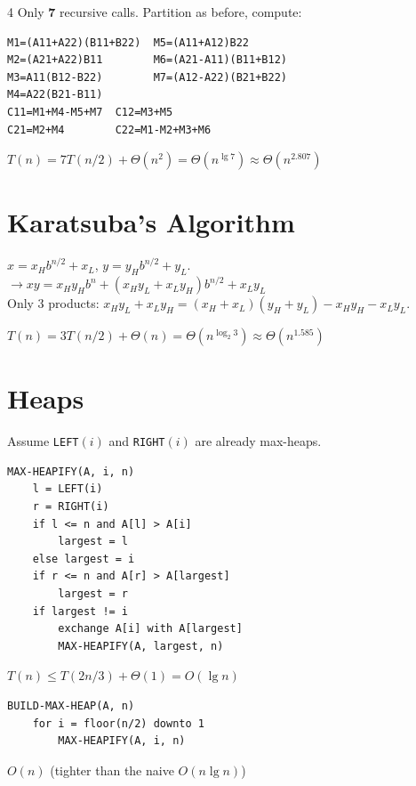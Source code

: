 \documentclass[8pt,a4paper,landscape]{extarticle}
\begin{document}
\begin{multicols*}{4}
Only \textbf{7} recursive calls. Partition as before, compute:
\begin{lstlisting}
M1=(A11+A22)(B11+B22)  M5=(A11+A12)B22
M2=(A21+A22)B11        M6=(A21-A11)(B11+B12)
M3=A11(B12-B22)        M7=(A12-A22)(B21+B22)
M4=A22(B21-B11)
C11=M1+M4-M5+M7  C12=M3+M5
C21=M2+M4        C22=M1-M2+M3+M6
\end{lstlisting}
\begin{prop}[title=Runtime]
$T(n)=7T(n/2)+\Theta(n^2)=\Theta(n^{\lg 7})\approx\Theta(n^{2.807})$
\end{prop}

\section{Karatsuba's Algorithm}
$x=x_H b^{n/2}+x_L$, $y=y_H b^{n/2}+y_L$.\\
$\rightarrow xy=x_Hy_H b^n+(x_Hy_L+x_Ly_H)b^{n/2}+x_Ly_L$\\
Only 3 products: $x_Hy_L+x_Ly_H=(x_H{+}x_L)(y_H{+}y_L)-x_Hy_H-x_Ly_L$.

\begin{prop}[title=Runtime]
$T(n)=3T(n/2)+\Theta(n)=\Theta(n^{\log_2 3})\approx\Theta(n^{1.585})$
\end{prop}

\section{Heaps}
Assume \texttt{LEFT}$(i)$ and \texttt{RIGHT}$(i)$ are already max-heaps.

\begin{lstlisting}
MAX-HEAPIFY(A, i, n)
    l = LEFT(i)
    r = RIGHT(i)
    if l <= n and A[l] > A[i]
        largest = l
    else largest = i
    if r <= n and A[r] > A[largest]
        largest = r
    if largest != i
        exchange A[i] with A[largest]
        MAX-HEAPIFY(A, largest, n)
\end{lstlisting}

\begin{prop}[title=Runtime]
$T(n) \le T(2n/3) + \Theta(1) = O(\lg n)$
\end{prop}

\begin{lstlisting}
BUILD-MAX-HEAP(A, n)
    for i = floor(n/2) downto 1
        MAX-HEAPIFY(A, i, n)
\end{lstlisting}

\begin{prop}[title=Runtime]
$O(n)$ (tighter than the naive $O(n \lg n)$)
\end{prop}


\end{multicols*}
\end{document}

